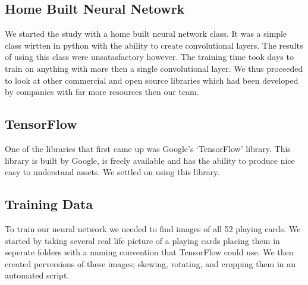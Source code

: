 \documentclass[letterpaper]{article}
\begin{document}
\subsection{Home Built Neural Netowrk}
We started the study with a home built neural network class.  It was a simple class wirtten in python with the ability to create convolutional layers.  The results of using this class were unsatasfactory however.  The training time took days to train on anything with more then a single convolutional layer.  We thus proceeded to look at other commercial and open source libraries which had been developed by companies with far more resources then our team.

\subsection{TensorFlow}
One of the libraries that first came up was Google's `TensorFlow' library.  This library is built by Google, is freely available and has the ability to produce nice easy to understand assets.  We settled on using this library.

\subsection{Training Data}
To train our neural network we needed to find images of all 52 playing cards.  We started by taking several real life picture of a playing cards placing them in seperate folders with a naming convention that TensorFlow could use.  We then created perversions of these images; skewing, rotating, and cropping them in an automated script.
\end{document}

